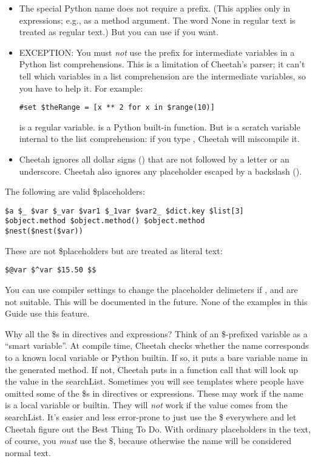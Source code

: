 \begin{itemize}
\item The special Python name  does not require a
     \code{\$} prefix.  (This applies only in expressions; e.g., as a method
     argument.  The word None in regular text is treated as regular text.)
     But you can use  if you want.

\item EXCEPTION: You must {\em not} use the \code{\$} prefix for intermediate
     variables in a Python list comprehensions.  This is a limitation of
     Cheetah's parser; it can't tell which variables in a list comprehension
     are the intermediate variables, so you have to help it.  For example:
\begin{verbatim}
#set $theRange = [x ** 2 for x in $range(10)]
\end{verbatim}
      is a regular  variable.   is a
     Python built-in function.  But  is a scratch variable internal to
     the list comprehension: if you type , Cheetah will miscompile it.
\item Cheetah ignores all dollar signs (\code{\$}) that are not followed by a
     letter or an underscore.  Cheetah also ignores any placeholder escaped by a
     backslash ().

\end{itemize} 

The following are valid \$placeholders:
\begin{verbatim}
$a $_ $var $_var $var1 $_1var $var2_ $dict.key $list[3]
$object.method $object.method() $object.method
$nest($nest($var))
\end{verbatim}

These are not \$placeholders but are treated as literal text:
\begin{verbatim}
$@var $^var $15.50 $$
\end{verbatim}

You can use compiler settings to change the placeholder delimeters if
\code{\$}, \code{\{} and \code{\}} are not suitable.  This will be documented
in the future.  None of the examples in this Guide use this feature.

Why all the \$s in directives and expressions?  Think of an \$-prefixed
variable as a ``smart variable''.  At compile time, Cheetah checks whether the
name corresponds to a known local variable or Python builtin.  If so, it puts
a bare variable name in the generated method.  If not, Cheetah puts in a 
function call that will look up the value in the searchList.  Sometimes you
will see templates where people have omitted some of the \$s in directives or
expressions.  These may work if the name is a local variable or builtin.
They will {\em not} work if the value comes from the searchList.  It's easier
and less error-prone to just use the \$ everywhere and let Cheetah figure out
the Best Thing To Do.  With ordinary placeholders in the text, of course, you
{\em must} use the \$, because otherwise the name will be considered normal 
text.

